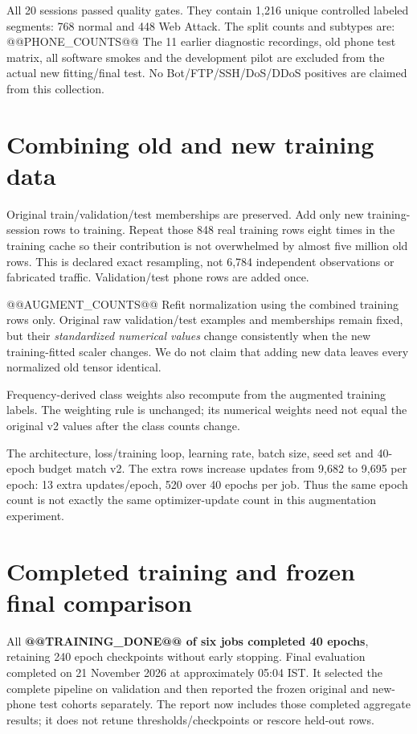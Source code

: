 \documentclass[11pt,a4paper,oneside]{report}
\begin{document}
All 20 sessions passed quality gates. They contain 1,216 unique controlled labeled segments: 768 normal and 448 Web Attack. The split counts and subtypes are:
@@PHONE_COUNTS@@
The 11 earlier diagnostic recordings, old phone test matrix, all software smokes and the development pilot are excluded from the actual new fitting/final test. No Bot/FTP/SSH/DoS/DDoS positives are claimed from this collection.

\section{Combining old and new training data}
Original train/validation/test memberships are preserved. Add only new training-session rows to training. Repeat those 848 real training rows eight times in the training cache so their contribution is not overwhelmed by almost five million old rows. This is declared exact resampling, not 6,784 independent observations or fabricated traffic. Validation/test phone rows are added once.

@@AUGMENT_COUNTS@@
Refit normalization using the combined training rows only. Original raw validation/test examples and memberships remain fixed, but their \emph{standardized numerical values} change consistently when the new training-fitted scaler changes. We do not claim that adding new data leaves every normalized old tensor identical.

Frequency-derived class weights also recompute from the augmented training labels. The weighting rule is unchanged; its numerical weights need not equal the original v2 values after the class counts change.

The architecture, loss/training loop, learning rate, batch size, seed set and 40-epoch budget match v2. The extra rows increase updates from 9,682 to 9,695 per epoch: 13 extra updates/epoch, 520 over 40 epochs per job. Thus the same epoch count is not exactly the same optimizer-update count in this augmentation experiment.

\section{Completed training and frozen final comparison}
All \textbf{@@TRAINING_DONE@@ of six jobs completed 40 epochs}, retaining 240 epoch checkpoints without early stopping. Final evaluation completed on 21 November 2026 at approximately 05:04 IST. It selected the complete pipeline on validation and then reported the frozen original and new-phone test cohorts separately. The report now includes those completed aggregate results; it does not retune thresholds/checkpoints or rescore held-out rows.
\end{document}
